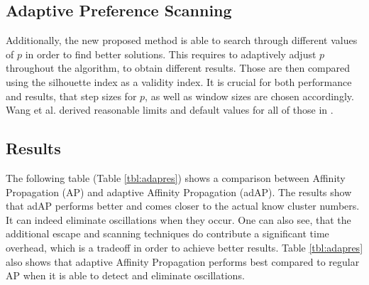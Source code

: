 \documentclass[11pt,a4paper]{article}
\begin{document}
\subsection{Adaptive Preference Scanning}
Additionally, the new proposed method is able to search through different values of $p$ in order to find better solutions. This requires to adaptively adjust $p$ throughout the algorithm, to obtain different results. Those are then compared using the silhouette index\cite{ROUSSEEUW198753} as a validity index. It is crucial for both performance and results, that step sizes for $p$, as well as window sizes are chosen accordingly. Wang et al. derived reasonable limits and default values for all of those in \cite{wang2008adaptive}.
\pagebreak
\subsection{Results}
The following table (Table \ref{tbl:adapres}) shows a comparison between Affinity Propagation (AP) and adaptive Affinity Propagation (adAP). The results show that adAP performs better and comes closer to the actual know cluster numbers. It can indeed eliminate oscillations when they occur. One can also see, that the additional escape and scanning techniques do contribute a significant time overhead, which is a tradeoff in order to achieve better results. Table \ref{tbl:adapres} also shows that adaptive Affinity Propagation performs best compared to regular AP when it is able to detect and eliminate oscillations.
\end{document}
